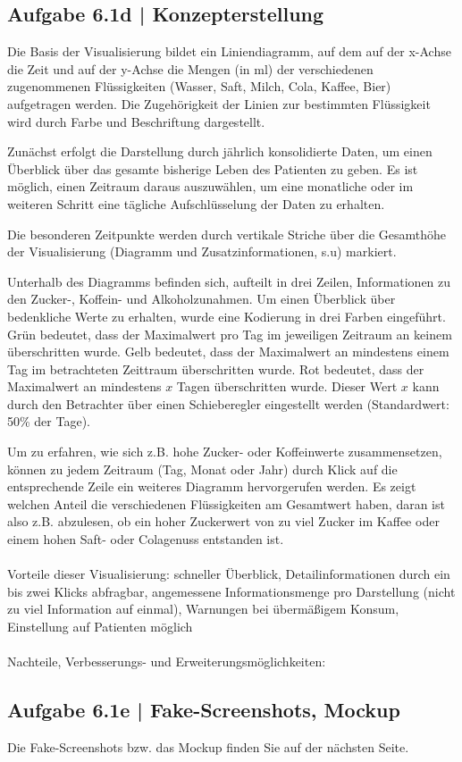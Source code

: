\documentclass[a4paper,12pt,ngerman]{scrartcl}
\begin{document}
\subsection{Aufgabe 6.1d | Konzepterstellung}
Die Basis der Visualisierung bildet ein Liniendiagramm, auf dem auf der x-Achse die Zeit und auf der y-Achse die Mengen (in ml) der verschiedenen zugenommenen Flüssigkeiten (Wasser, Saft, Milch, Cola, Kaffee, Bier) aufgetragen werden. Die Zugehörigkeit der Linien zur bestimmten Flüssigkeit wird durch Farbe und Beschriftung dargestellt.

Zunächst erfolgt die Darstellung durch jährlich konsolidierte Daten, um einen Überblick über das gesamte bisherige Leben des Patienten zu geben. Es ist möglich, einen Zeitraum daraus auszuwählen, um eine monatliche oder im weiteren Schritt eine tägliche Aufschlüsselung der Daten zu erhalten.

Die besonderen Zeitpunkte werden durch vertikale Striche über die Gesamthöhe der Visualisierung (Diagramm und Zusatzinformationen, s.u) markiert.

Unterhalb des Diagramms befinden sich, aufteilt in drei Zeilen, Informationen zu den Zucker-, Koffein- und Alkoholzunahmen. Um einen Überblick über bedenkliche Werte zu erhalten, wurde eine Kodierung in drei Farben eingeführt. Grün bedeutet, dass der Maximalwert pro Tag im jeweiligen Zeitraum an keinem überschritten wurde. Gelb bedeutet, dass der Maximalwert an mindestens einem Tag im betrachteten Zeittraum überschritten wurde. Rot bedeutet, dass der Maximalwert an mindestens $x$ Tagen überschritten wurde. Dieser Wert $x$ kann durch den Betrachter über einen Schieberegler eingestellt werden (Standardwert: 50\% der Tage).

Um zu erfahren, wie sich z.B. hohe Zucker- oder Koffeinwerte zusammensetzen, können zu jedem Zeitraum (Tag, Monat oder Jahr) durch Klick auf die entsprechende Zeile ein weiteres Diagramm hervorgerufen werden. Es zeigt welchen Anteil die verschiedenen Flüssigkeiten am Gesamtwert haben, daran ist also z.B. abzulesen, ob ein hoher Zuckerwert von zu viel Zucker im Kaffee oder einem hohen Saft- oder Colagenuss entstanden ist.
\\\\
Vorteile dieser Visualisierung: schneller Überblick, Detailinformationen durch ein bis zwei Klicks abfragbar, angemessene Informationsmenge pro Darstellung (nicht zu viel Information auf einmal), Warnungen bei übermäßigem Konsum, Einstellung auf Patienten möglich
\\\\
Nachteile, Verbesserungs- und Erweiterungsmöglichkeiten:

\subsection{Aufgabe 6.1e | Fake-Screenshots, Mockup}
Die Fake-Screenshots bzw. das Mockup finden Sie auf der nächsten Seite.


\end{document}
